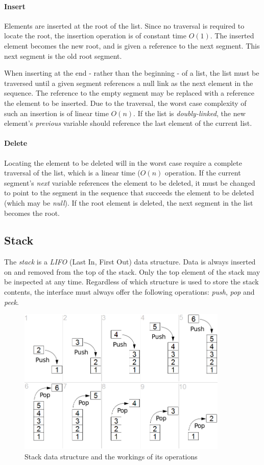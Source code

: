 \documentclass{article}
\begin{document}
\paragraph{Insert}
Elements are inserted at the root of the list. Since no traversal is required to locate the root,
the insertion operation is of constant time \(O(1)\). The inserted element becomes the new root,
and is given a reference to the next segment. This next segment is the old root segment.

When inserting at the end - rather than the beginning - of a list, the list must be traversed until a given segment
references a null link as the next element in the sequence. The reference to the empty segment may be replaced with
a reference the element to be inserted. Due to the traversal, the worst case complexity of such an insertion is of
linear time \(O(n)\). If the list is {\em doubly-linked}, the new element's {\em previous} variable should reference
the last element of the current list.

\paragraph{Delete}
Locating the element to be deleted will in the worst case require a complete traversal of the list,
which is a linear time (\(O(n)\) operation. If the current segment's {\em next} variable references
the element to be deleted, it must be changed to point to the segment in the sequence that succeeds
the element to be deleted (which may be {\em null}). If the root element is deleted, the next segment
in the list becomes the root.




\subsection{Stack}
The {\em stack} is a {\em LIFO} (Last In, First Out) data structure. Data is always inserted on and removed
from the top of the stack. Only the top element of the stack may be inspected at any time. Regardless of which
structure is used to store the stack contents, the interface must always offer the following operations:
{\em push}, {\em pop} and {\em peek}.

\begin{figure}[H]
  \centering
  \includegraphics[width=10cm]{stack}
  \caption{Stack data structure and the workings of its operations}
\end{figure}
\end{document}
